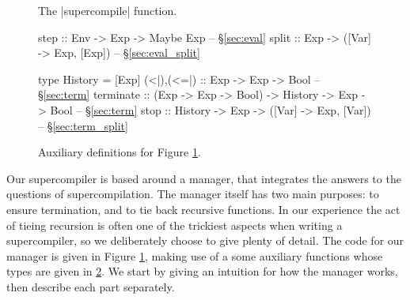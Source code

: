 \documentclass[draft]{sigplanconf}
\begin{document}
\begin{figure}
\caption{The |supercompile| function.}
\label{fig:manager}
\end{figure}

\begin{figure}
\begin{code}
step :: Env -> Exp -> Maybe Exp -- \S\ref{sec:eval}
split :: Exp -> ([Var] -> Exp, [Exp]) -- \S\ref{sec:eval_split}

type History = [Exp]
(<|),(<=|) :: Exp -> Exp -> Bool -- \S\ref{sec:term}
terminate  :: (Exp -> Exp -> Bool)
           -> History -> Exp -> Bool -- \S\ref{sec:term}
stop :: History -> Exp -> ([Var] -> Exp, [Var]) -- \S\ref{sec:term_split}
\end{code}
\caption{Auxiliary definitions for Figure \ref{fig:manager}.}
\label{fig:manager2}
\end{figure}

Our supercompiler is based around a manager, that integrates the answers to the questions of supercompilation. The manager itself has two main purposes: to ensure termination, and to tie back recursive functions. In our experience the act of tieing recursion is often one of the trickiest aspects when writing a supercompiler, so we deliberately choose to give plenty of detail. The code for our manager is given in Figure \ref{fig:manager}, making use of a some auxiliary functions whose types are given in \ref{fig:manager2}. We start by giving an intuition for how the manager works, then describe each part separately.
\end{document}
